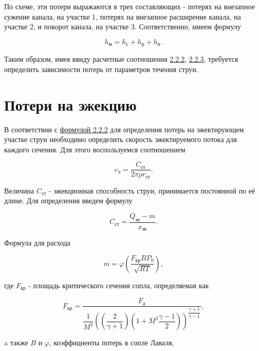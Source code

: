По схеме, эти потери выражаются в трех составляющих - потерях на внезапное сужение канала, на участке 1, потерях на внезапное расширение канала, на участке 2, и поворот канала, на участке 3. Соответственно, имеем формулу

\begin{equation}
    \label{eqn:LocalLosses}
    h_\text{м}=h_\text{с}+h_\text{р}+h_\text{п}.
\end{equation}

Таким образом, имея ввиду расчетные соотношения \hyperref[eqn:EjectionLosses]{2.2.2}, \hyperref[eqn:LocalLosses]{2.2.3}, требуется определить зависимости потерь от параметров течения струи.

\section{Потери на эжекцию}
В соответствии с \hyperref[eqn:EjectionLosses]{формулой 2.2.2} для определения потерь на эжектирующем участке струи необходимо определить скорость эжектируемого потока для каждого сечения. Для этого воспользуемся соотношением

\begin{equation}
    \label{eqn:EjectionVelocity}
    \upsilon_\text{э}=\dfrac{C_\text{ст}}{2\pi\rho r_\text{ст}}.
\end{equation}

Величина $C_\text{ст}$ - эжекционная способность струи, принимается постоянной по её длине. Для определения введем формулу

\begin{equation}
    \label{eqn:EjectionAbility}
    C_\text{ст}=\dfrac{Q_\text{зв}-m}{x_\text{зв}}.
\end{equation}

Формула для расхода

\begin{equation}
    \label{eqn:Consumption}
    m=\varphi(\dfrac{F_\text{кр}BP_{0}}{\sqrt{RT}}),
\end{equation}

где $F_\text{кр}$ - площадь критического сечения сопла, определяемая как

\begin{equation}
    \label{eqn:CriticalSquare}
    F_\text{кр}=\dfrac{F_\text{а}}{\dfrac{1}{M^2}((\dfrac{2}{\gamma+1})(1+M^2 \dfrac{\gamma-1}{2}))^{\dfrac{\gamma+1}{\gamma-1}}},
\end{equation}

a также $B$ и $\varphi$, коэффициенты потерь в сопле Лаваля,

